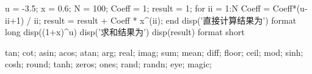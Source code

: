 u = -3.5;
x = 0.6; %
N = 100; %
Coeff = 1; %
result = 1; %
for ii = 1:N
    Coeff = Coeff*(u-ii+1) / ii;
    result = result + Coeff * x^(ii);
end
disp('直接计算结果为')
format long %
disp((1+x)^u)
disp('求和结果为')
disp(result)
format short %

tan; cot; asin; acos; atan; arg; real; imag; sum; mean; diff; floor; ceil; mod; sinh; cosh; round; tanh; zeros; ones; rand; randn; eye; magic;
